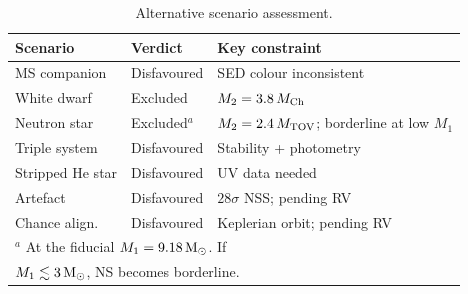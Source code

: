 \documentclass[usenatbib,fleqn]{mnras}
\newcommand{\Msun}{{\rm M}_\odot}
\newcommand{\Rsun}{{\rm R}_\odot}
\begin{document}
\begin{table}
\end{table}

\begin{table}
\centering
\caption{Alternative scenario assessment.}
\label{tab:scenarios}
\begin{tabular}{lll}
\toprule
Scenario & Verdict & Key constraint \\
\midrule
MS companion    & Disfavoured  & SED colour inconsistent \\
White dwarf     & Excluded     & $M_2 = 3.8\,M_{\rm Ch}$ \\
Neutron star    & Excluded$^a$ & $M_2 = 2.4\,M_{\rm TOV}$; borderline at low $M_1$ \\
Triple system   & Disfavoured  & Stability + photometry \\
Stripped He star & Disfavoured & UV data needed \\
Artefact        & Disfavoured  & $28\sigma$ NSS; pending RV \\
Chance align.   & Disfavoured  & Keplerian orbit; pending RV \\
\bottomrule
\multicolumn{3}{l}{$^a$ At the fiducial $M_1 = 9.18\,\Msun$.  If}\\
\multicolumn{3}{l}{$M_1 \lesssim 3\,\Msun$, NS becomes borderline.}\\
\end{tabular}
\end{table}
\end{document}
